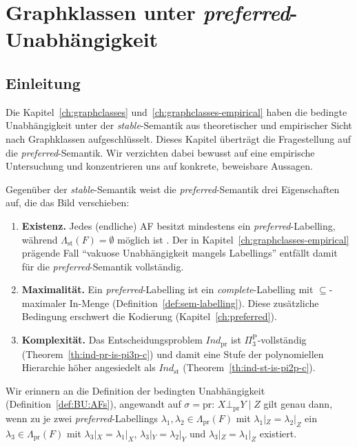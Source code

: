 \chapter{Graphklassen unter \textit{preferred}-Unabh\"angigkeit}
\label{ch:graphclasses-preferred}

\section{Einleitung}
\label{sec:gcp-einleitung}

Die Kapitel~\ref{ch:graphclasses} und~\ref{ch:graphclasses-empirical} haben die
bedingte Unabh\"angigkeit unter der \textit{stable}-Semantik aus theoretischer
und empirischer Sicht nach Graphklassen aufgeschl\"usselt. Dieses Kapitel
\"ubertr\"agt die Fragestellung auf die \textit{preferred}-Semantik. Wir
verzichten dabei bewusst auf eine empirische Untersuchung und konzentrieren uns
auf konkrete, beweisbare Aussagen.

Gegen\"uber der \textit{stable}-Semantik weist die
\textit{preferred}-Semantik drei Eigenschaften auf, die das Bild verschieben:
\begin{enumerate}
    \item \textbf{Existenz.} Jedes (endliche) AF besitzt mindestens ein
    \textit{preferred}-Labelling, w\"ahrend
    \(\Lambda_{\mathrm{st}}(F)=\emptyset\) m\"oglich ist
    \cite{dung:1995:af}. Der in Kapitel~\ref{ch:graphclasses-empirical}
    pr\"agende Fall \enquote{vakuose Unabh\"angigkeit mangels Labellings}
    entf\"allt damit f\"ur die \textit{preferred}-Semantik vollst\"andig.
    \item \textbf{Maximalit\"at.} Ein \textit{preferred}-Labelling ist ein
    \textit{complete}-Labelling mit \(\subseteq\)-maximaler In-Menge
    (Definition~\ref{def:sem-labelling}). Diese zus\"atzliche Bedingung
    erschwert die Kodierung (Kapitel~\ref{ch:preferred}).
    \item \textbf{Komplexit\"at.} Das Entscheidungsproblem
    \(\textit{Ind}_{\mathrm{pr}}\) ist \(\Pi_3^{\mathrm P}\)-vollst\"andig
    (Theorem~\ref{th:ind-pr-is-pi3p-c}) und damit eine Stufe der polynomiellen
    Hierarchie h\"oher angesiedelt als \(\textit{Ind}_{\mathrm{st}}\)
    (Theorem~\ref{th:ind-st-is-pi2p-c}).
\end{enumerate}

Wir erinnern an die Definition der bedingten Unabh\"angigkeit
(Definition~\ref{def:BU:AFs}), angewandt auf \(\sigma=\mathrm{pr}\):
\(X\bot_{\mathrm{pr}}Y\mid Z\) gilt genau dann, wenn zu je zwei
\textit{preferred}-Labellings \(\lambda_1,\lambda_2\in\Lambda_{\mathrm{pr}}(F)\)
mit \(\lambda_1|_Z=\lambda_2|_Z\) ein
\(\lambda_3\in\Lambda_{\mathrm{pr}}(F)\) mit \(\lambda_3|_X=\lambda_1|_X\),
\(\lambda_3|_Y=\lambda_2|_Y\) und \(\lambda_3|_Z=\lambda_1|_Z\) existiert.

